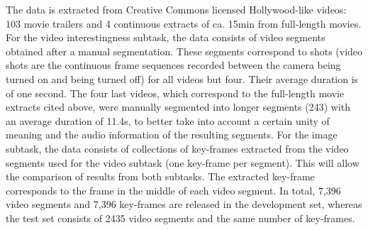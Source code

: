 \documentclass[sigconf]{acmart-me}
\begin{document}
The data is extracted from Creative Commons licensed Hollywood-like videos: 103 movie trailers and 4 continuous extracts of ca. 15min from full-length movies. 
For the video interestingness subtask, the data consists of video segments obtained after a manual segmentation. These segments correspond to shots (video shots are the continuous frame sequences recorded between the camera being turned on and being turned off) for all videos but four. Their average duration is of one second. The four last videos, which correspond to the full-length movie extracts cited above, were manually segmented into longer segments (243) with an average duration of 11.4s, to better take into account a certain unity of meaning and the audio information of the resulting segments. For the image subtask, the data consists of collections of key-frames extracted from the video segments used for the video subtask (one key-frame per segment). This will allow the comparison of results from both subtasks. The extracted key-frame corresponds to the frame in the middle of each video segment.
In total, 7,396 video segments and 7,396 key-frames are released in the development set, whereas the test set consists of 2435 video segments and the same number of key-frames.

\end{document}
